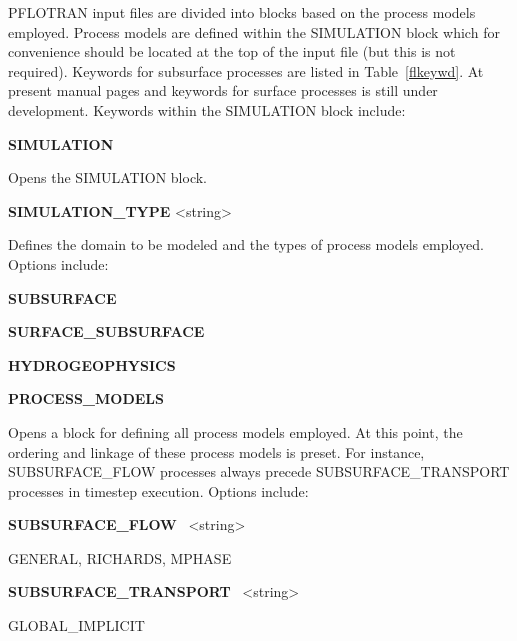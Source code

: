 PFLOTRAN input files are divided into blocks based on the process models employed. Process models are defined within the SIMULATION block which for convenience should be located at the top of the input file (but this is not required). 
Keywords for subsurface processes are listed in Table~\ref{flkeywd}. At present  manual pages and keywords for surface processes is still under development.
Keywords within the SIMULATION block include:
\begin{description}
\item {\bf SIMULATION}
\begin{description}
    \item Opens the SIMULATION block.
    \end{description}

\item {\bf SIMULATION\_TYPE}  <string>
\begin{description}
    \item Defines the domain to be modeled and the types of process 
    models employed. Options include:
    
    \item {\bf SUBSURFACE}

    \item {\bf SURFACE\_SUBSURFACE}

    \item {\bf HYDROGEOPHYSICS}
\end{description}

\item {\bf PROCESS\_MODELS}
\begin{description}
\item Opens a block for defining all process models employed. 
    At this point, the ordering and linkage of these process 
    models is preset. For instance, SUBSURFACE\_FLOW processes 
    always precede SUBSURFACE\_TRANSPORT processes in timestep 
    execution. Options include:
    
\item {\bf SUBSURFACE\_FLOW} \ <string>
\begin{description}
\item GENERAL, RICHARDS, MPHASE
\end{description}
\item \keyend

\item {\bf SUBSURFACE\_TRANSPORT} \ <string>
\begin{description}
\item GLOBAL\_IMPLICIT
\end{description}
\item \keyend


\end{description}
\end{description}
